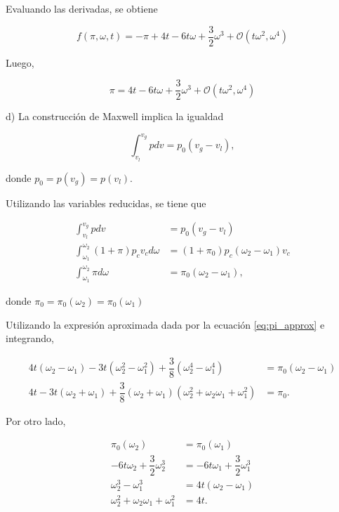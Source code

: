 \documentclass[10pt]{article}
\begin{document}
Evaluando las derivadas, se obtiene

\begin{equation}
f(\pi, \omega, t) = -\pi + 4t -6t\omega +\dfrac{3}{2}\omega^3 + \mathcal{O}(t\omega^2, \omega^4)
\end{equation}

Luego,

\begin{equation}\label{eq:pi_approx}
\pi = 4t -6t\omega +\dfrac{3}{2}\omega^3  + \mathcal{O}(t\omega^2, \omega^4)
\end{equation}

d) La construcci\'on de Maxwell implica la igualdad

\begin{equation}
\int_{v_l}^{v_g} p dv = p_0 (v_g - v_l),
\end{equation}

donde $p_0 = p(v_g) = p(v_l)$.

Utilizando las variables reducidas, se tiene que 

\begin{align}
\int_{v_l}^{v_g} p dv &= p_0 (v_g - v_l) \\
\int_{\omega_1}^{\omega_2} (1+\pi) p_c v_c d\omega &= (1+\pi_0) p_c (\omega_2 - \omega_1) v_c \\
\int_{\omega_1}^{\omega_2} \pi d\omega &= \pi_0 (\omega_2 - \omega_1),
\end{align}

donde $\pi_0 = \pi_0(\omega_2) = \pi_0(\omega_1)$

Utilizando la expresi\'on aproximada dada por la ecuaci\'on \ref{eq:pi_approx} e integrando,

\begin{align}
4t(\omega_2 - \omega_1) - 3t(\omega_2^2 - \omega_1^2) + \dfrac{3}{8} (\omega_2^4- \omega_1^4) &= \pi_0 (\omega_2 - \omega_1) \nonumber \\
4t - 3t(\omega_2 + \omega_1) + \dfrac{3}{8} (\omega_2 + \omega_1) (\omega_2^2 + \omega_2 \omega_1 + \omega_1^2) &= \pi_0. \label{eq:maxwell_integrated}
\end{align}

Por otro lado,

\begin{align}
\pi_0(\omega_2) &= \pi_0(\omega_1) \nonumber \\
 -6t\omega_2 + \dfrac{3}{2}\omega_2^3 &= -6t\omega_1 + \dfrac{3}{2}\omega_1^3 \nonumber \\
 \omega_2^3-\omega_1^3 &= 4t(\omega_2 - \omega_1) \nonumber \\
  \omega_2^2+\omega_2  \omega_1 + \omega_1^2 &= 4t. \label{eq:4t_equal_omegas}
\end{align}
\end{document}
